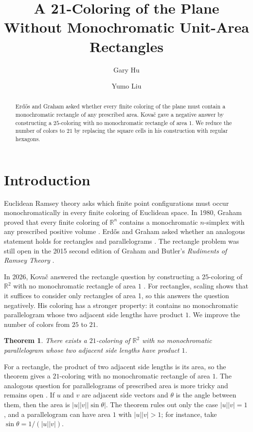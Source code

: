 \documentclass[12pt,reqno]{amsart}
\title[A 21-coloring of the plane]{A 21-Coloring of the Plane Without Monochromatic Unit-Area Rectangles}
\author[Gary Hu]{Gary Hu}
\author[Yumo Liu]{Yumo Liu}
\date{}
\newtheorem{theorem}{Theorem}
\theoremstyle{remark}
\theoremstyle{definition}
\numberwithin{equation}{section}
\begin{document}
\begin{abstract}
Erd\H{o}s and Graham asked whether every finite coloring of the plane must contain a monochromatic rectangle of any prescribed area. Kova\v{c} gave a negative answer by constructing a $25$-coloring with no monochromatic rectangle of area $1$. We reduce the number of colors to $21$ by replacing the square cells in his construction with regular hexagons.
\end{abstract}

\maketitle

\section{Introduction}

Euclidean Ramsey theory asks which finite point configurations must occur monochromatically in every finite coloring of Euclidean space. In 1980, Graham proved that every finite coloring of $\mathbb R^n$ contains a monochromatic $n$-simplex with any prescribed positive volume \cite{graham}. Erd\H{o}s and Graham asked whether an analogous statement holds for rectangles and parallelograms \cite{erdos-graham}. The rectangle problem was still open in the 2015 second edition of Graham and Butler's \emph{Rudiments of Ramsey Theory} \cite{graham-butler}.

In 2026, Kova\v{c} answered the rectangle question by constructing a $25$-coloring of $\mathbb R^2$ with no monochromatic rectangle of area $1$ \cite{kovac}. For rectangles, scaling shows that it suffices to consider only rectangles of area 1, so this answers the question negatively. His coloring has a stronger property: it contains no monochromatic parallelogram whose two adjacent side lengths have product $1$. We improve the number of colors from $25$ to $21$.

\begin{theorem}\label{thm:main}
There exists a $21$-coloring of $\mathbb R^2$ with no monochromatic parallelogram whose two adjacent side lengths have product $1$.
\end{theorem}

For a rectangle, the product of two adjacent side lengths is its area, so the theorem gives a $21$-coloring with no monochromatic rectangle of area $1$. The analogous question for parallelograms of prescribed area is more tricky and remains open \cite{kovac}. If $u$ and $v$ are adjacent side vectors and $\theta$ is the angle between them, then the area is $|u||v||\sin\theta|$. The theorem rules out only the case $|u||v|=1$, and a parallelogram can have area $1$ with $|u||v|>1$; for instance, take $\sin\theta=1/(|u||v|)$.
\end{document}
